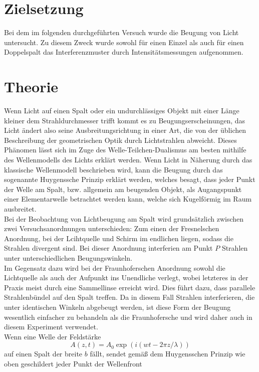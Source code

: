 \section{Zielsetzung}
Bei dem im folgenden durchgeführten Versuch wurde die Beugung von Licht untersucht. Zu diesem Zweck wurde sowohl für einen Einzel als 
auch für einen Doppelspalt das Interferenzmuster durch Intensitätsmessungen aufgenommen.
\section{Theorie}
Wenn Licht auf einen Spalt oder ein undurchlässiges Objekt mit einer Länge kleiner dem Strahldurchmesser trifft kommt es zu Beugungserscheinungen,
das Licht ändert also seine Ausbreitungsrichtung in einer Art, die von der üblichen Beschreibung der geometrischen Optik durch Lichtstrahlen
abweicht. Dieses Phänomen lässt sich im Zuge des Welle-Teilchen-Dualismus am besten mithilfe des Wellenmodells des Lichts erklärt werden.
Wenn Licht in Näherung durch das klassische Wellenmodell beschrieben wird, kann die Beugung durch das sogenannte Huygenssche Prinzip erklärt werden,
welches besagt, dass jeder Punkt der Welle am Spalt, bzw. allgemein am beugenden Objekt, als Augangspunkt einer Elementarwelle betrachtet werden kann, welche 
sich Kugelförmig im Raum ausbreitet. \\
Bei der Beobachtung von Lichtbeugung am Spalt wird grundsätzlich zwischen zwei Versuchsanordnungen unterschieden: Zum einen der Fresnelschen Anordnung, bei der
Lcihtquelle und Schirm im endlichen liegen, sodass die Strahlen divergent sind. Bei dieser Anordnung interferien am Punkt $P$ Strahlen unter
unterschiedlichen Beugungswinkeln. \\ Im Gegensatz dazu wird bei der Fraunhoferschen Anordnung sowohl die Lichtquelle als auch der Aufpunkt
ins Unendliche verlegt, wobei letzteres in der Praxis meist durch eine Sammellinse erreicht wird. Dies führt dazu, dass parallele Strahlenbündel
auf den Spalt treffen. Da in diesem Fall Strahlen interferieren, die unter identischen Winkeln abgebeugt werden, ist diese Form der Beugung wesentlich 
einfacher zu behandeln als die Fraunhofersche und wird daher auch in diesem Experiment verwendet. \\
Wenn eine Welle der Feldstärke
\begin{equation}
A(z,t)=A_0\exp(i(wt-2\pi z/\lambda))
\end{equation}
auf einen Spalt der breite $b$ fällt, sendet gemäß dem Huygensschen Prinzip wie oben geschildert jeder Punkt der Wellenfront
